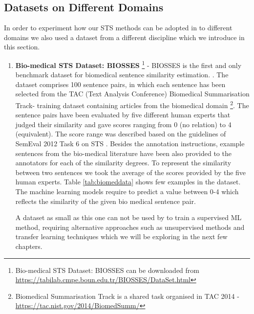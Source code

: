 \subsection{Datasets on Different Domains}
In order to experiment how our STS methods can be adopted in to different domains we also used a dataset from a different discipline which we introduce in this section. 
\begin{enumerate}
	
	\item{ \textbf{Bio-medical STS Dataset: BIOSSES } \footnote{Bio-medical STS Dataset: BIOSSES  can be downloaded from \url{https://tabilab.cmpe.boun.edu.tr/BIOSSES/DataSet.html} }} - BIOSSES is the first and only benchmark dataset for biomedical  sentence  similarity  estimation.
	\cite{10.1093/bioinformatics/btx238}. The  dataset  comprises 100 sentence pairs, in which each sentence has been selected from the TAC (Text Analysis Conference) Biomedical Summarisation Track- training dataset containing articles from  the  biomedical domain \footnote{Biomedical Summarisation Track is a shared task organised in TAC 2014 - \url{https://tac.nist.gov/2014/BiomedSumm/}}. The sentence pairs have been evaluated by five different human experts that judged their similarity and gave scores ranging from 0 (no relation) to 4 (equivalent). The score range was described based on the guidelines of SemEval 2012 Task 6 on STS \cite{agirre-etal-2012-semeval}. Besides the annotation instructions, example sentences from the bio-medical literature have been also provided to the annotators for each of the similarity degrees. To represent the similarity between two sentences we took the average of the scores provided by the five human experts. Table \ref{tab:biomeddata} shows few examples in the dataset. The machine learning models require to predict a value between 0-4 which reflects the similarity of the given bio medical sentence pair.
	
	A dataset as small as this one can not be used by to train a supervised ML method, requiring alternative approaches such as unsupervised methods and transfer learning techniques which we will be exploring in the next few chapters.
	

\end{enumerate}
